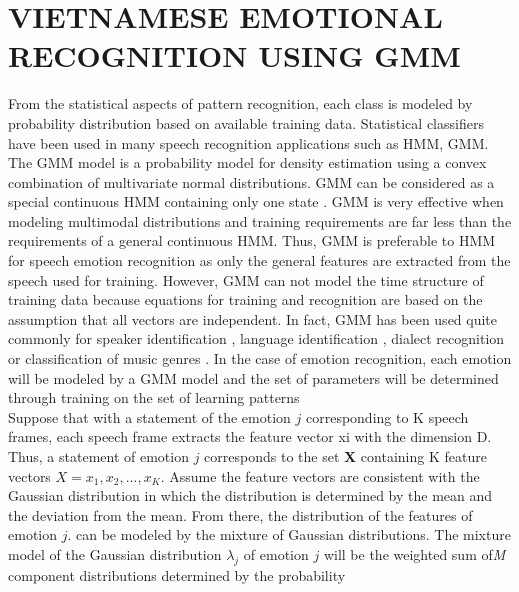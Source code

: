 \documentclass[a4paper,12pt]{article}
\begin{document}
\section{VIETNAMESE EMOTIONAL RECOGNITION USING GMM}
From the statistical aspects of pattern recognition, each class is modeled by probability
distribution based on available training data. Statistical classifiers have been used in many
speech recognition applications such as HMM, GMM. The GMM model is a probability
model for density estimation using a convex combination of multivariate normal distributions.
GMM can be considered as a special continuous HMM containing only one state \cite{12}. GMM
is very effective when modeling multimodal distributions and training requirements are far
less than the requirements of a general continuous HMM. Thus, GMM is preferable to HMM
for speech emotion recognition as only the general features are extracted from the speech
used for training. However, GMM can not model the time structure of training data because
equations for training and recognition are based on the assumption that all vectors are
independent. In fact, GMM has been used quite commonly for speaker identification \cite{9},
language identification \cite{10}, dialect recognition \cite{11} or classification of music genres \cite{13}. In the case of emotion recognition, each emotion will be modeled by a GMM model and the set of parameters will be determined through training on the set of learning patterns
\\
Suppose that with a statement of the emotion $j$ corresponding to K speech frames, each
speech frame extracts the feature vector xi with the dimension D. Thus, a statement of emotion $j$ corresponds to the set \textbf{X} containing K feature vectors $X = {x_1, x_2, . . . , x_K}$. Assume
the feature vectors are consistent with the Gaussian distribution in which the distribution
is determined by the mean and the deviation from the mean. From there, the distribution
of the features of emotion $j$. can be modeled by the mixture of Gaussian distributions. The
mixture model of the Gaussian distribution $\lambda_j$ of emotion $j$ will be the weighted sum of\textit{M}
component distributions determined by the probability
\end{document}
